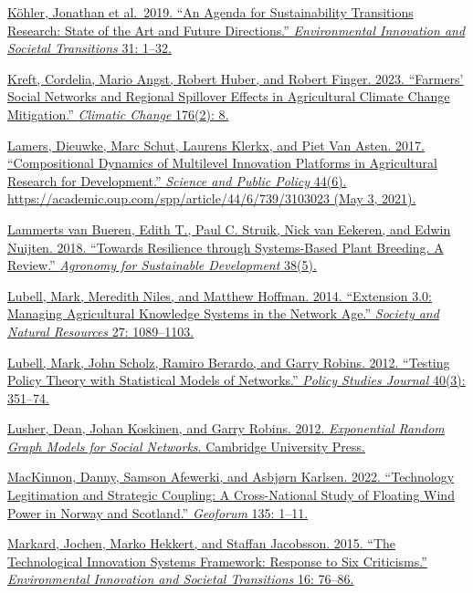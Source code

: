 \documentclass[twoside,12pt,final]{ucthesis-CA2012}
\begin{document}
\begin{ucmainmatter}
\href{https://www.zotero.org/google-docs/?hv36Bh}{Köhler, Jonathan et al.~2019. ``An Agenda for Sustainability Transitions
Research: State of the Art and Future Directions.'' \emph{Environmental
Innovation and Societal Transitions} 31:
1--32.}

\href{https://www.zotero.org/google-docs/?hv36Bh}{Kreft, Cordelia, Mario Angst, Robert Huber, and Robert Finger. 2023.
``Farmers' Social Networks and Regional Spillover Effects in Agricultural
Climate Change Mitigation.'' \emph{Climatic Change} 176(2):
8.}

\href{https://www.zotero.org/google-docs/?hv36Bh}{Lamers, Dieuwke, Marc Schut, Laurens Klerkx, and Piet Van Asten. 2017.
``Compositional Dynamics of Multilevel Innovation Platforms in
Agricultural Research for Development.'' \emph{Science and Public Policy}
44(6). https://academic.oup.com/spp/article/44/6/739/3103023 (May 3,
2021).}

\href{https://www.zotero.org/google-docs/?hv36Bh}{Lammerts van Bueren, Edith T., Paul C. Struik, Nick van Eekeren, and
Edwin Nuijten. 2018. ``Towards Resilience through Systems-Based Plant
Breeding. A Review.'' \emph{Agronomy for Sustainable Development}
38(5).}

\href{https://www.zotero.org/google-docs/?hv36Bh}{Lubell, Mark, Meredith Niles, and Matthew Hoffman. 2014. ``Extension
3.0: Managing Agricultural Knowledge Systems in the Network Age.''
\emph{Society and Natural Resources} 27:
1089--1103.}

\href{https://www.zotero.org/google-docs/?hv36Bh}{Lubell, Mark, John Scholz, Ramiro Berardo, and Garry Robins. 2012.
``Testing Policy Theory with Statistical Models of Networks.'' \emph{Policy
Studies Journal} 40(3):
351--74.}

\href{https://www.zotero.org/google-docs/?hv36Bh}{Lusher, Dean, Johan Koskinen, and Garry Robins. 2012. \emph{Exponential
Random Graph Models for Social Networks}. Cambridge University
Press.}

\href{https://www.zotero.org/google-docs/?hv36Bh}{MacKinnon, Danny, Samson Afewerki, and Asbjørn Karlsen. 2022.
``Technology Legitimation and Strategic Coupling: A Cross-National Study
of Floating Wind Power in Norway and Scotland.'' \emph{Geoforum} 135:
1--11.}

\href{https://www.zotero.org/google-docs/?hv36Bh}{Markard, Jochen, Marko Hekkert, and Staffan Jacobsson. 2015. ``The
Technological Innovation Systems Framework: Response to Six Criticisms.''
\emph{Environmental Innovation and Societal Transitions} 16:
76--86.}


\end{ucmainmatter}
\end{document}

